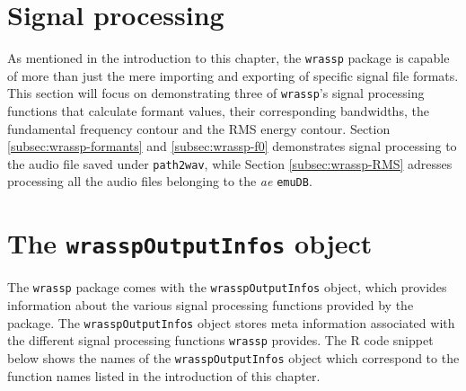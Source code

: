 \documentclass[]{book}
\newenvironment{Shaded}{\begin{snugshade}}{\end{snugshade}}
\newcommand{\CommentTok}[1]{\textcolor[rgb]{0.56,0.35,0.01}{\textit{#1}}}
\newcommand{\FloatTok}[1]{\textcolor[rgb]{0.00,0.00,0.81}{#1}}
\newcommand{\KeywordTok}[1]{\textcolor[rgb]{0.13,0.29,0.53}{\textbf{#1}}}
\newcommand{\NormalTok}[1]{#1}
\newcommand{\OperatorTok}[1]{\textcolor[rgb]{0.81,0.36,0.00}{\textbf{#1}}}
\newcommand{\StringTok}[1]{\textcolor[rgb]{0.31,0.60,0.02}{#1}}
\begin{document}
\begin{Shaded}
\end{Shaded}

\hypertarget{signal-processing}{%
\section{Signal processing}\label{signal-processing}}

As mentioned in the introduction to this chapter, the \texttt{wrassp} package is capable of more than just the mere importing and exporting of specific signal file formats. This section will focus on demonstrating three of \texttt{wrassp}'s signal processing functions that calculate formant values, their corresponding bandwidths, the fundamental frequency contour and the RMS energy contour. Section \ref{subsec:wrassp-formants} and \ref{subsec:wrassp-f0} demonstrates signal processing to the audio file saved under \texttt{path2wav}, while Section \ref{subsec:wrassp-RMS} adresses processing all the audio files belonging to the \emph{ae} \texttt{emuDB}.

\hypertarget{subsec:wrassp-wrasspOutputInfos}{%
\section{\texorpdfstring{The \texttt{wrasspOutputInfos} object}{The wrasspOutputInfos object}}\label{subsec:wrassp-wrasspOutputInfos}}

The \texttt{wrassp} package comes with the \texttt{wrasspOutputInfos} object, which provides information about the various signal processing functions provided by the package. The \texttt{wrasspOutputInfos} object stores meta information associated with the different signal processing functions \texttt{wrassp} provides. The R code snippet below shows the names of the \texttt{wrasspOutputInfos} object which correspond to the function names listed in the introduction of this chapter.
\end{document}

